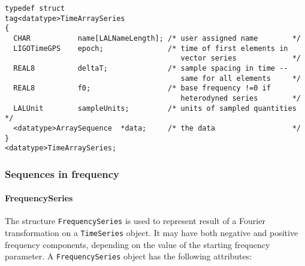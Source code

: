 \documentclass[]{ligodcc}
\renewcommand{\texttt}[1]{{\ttfamily\color{blue}#1}}
\begin{document}
{\footnotesize
\begin{verbatim}
typedef struct
tag<datatype>TimeArraySeries
{
  CHAR           name[LALNameLength]; /* user assigned name        */
  LIGOTimeGPS    epoch;               /* time of first elements in
                                         vector series             */
  REAL8          deltaT;              /* sample spacing in time -- 
                                         same for all elements     */
  REAL8          f0;                  /* base frequency !=0 if 
                                         heterodyned series        */
  LALUnit        sampleUnits;         /* units of sampled quantities */
  <datatype>ArraySequence  *data;     /* the data                  */
}
<datatype>TimeArraySeries;
\end{verbatim}}

\subsubsection{Sequences in frequency}

\paragraph{{\texttt {FrequencySeries}} \\}

The structure {\tt FrequencySeries} is used to represent result of a Fourier
transformation on a {\tt TimeSeries} object. It may have both negative and
positive frequency components, depending on the value of the starting
frequency parameter. A {\tt FrequencySeries} object has the following
attributes:
\end{document}
